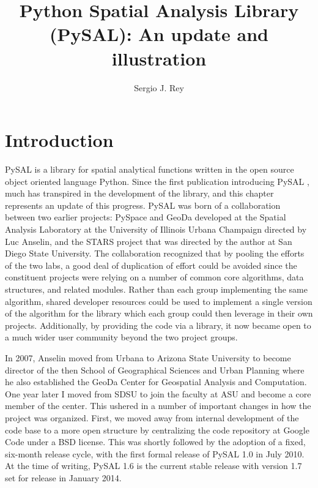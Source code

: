 \documentclass[11pt, titlepage]{amsart}
\author{Sergio J. Rey}
\title[PySAL]{Python Spatial Analysis Library (PySAL): An update and
illustration}
\date{}
\begin{document}
\maketitle


\section{Introduction}
PySAL is a library for spatial analytical functions written in the open
source object oriented language Python.
Since the first publication introducing PySAL \citep{Rey:2007ox},
much has transpired in the development of the library, and this chapter
represents an update of this progress. PySAL was born of a
collaboration between two earlier projects: PySpace and GeoDa developed
at the Spatial Analysis Laboratory at the University of Illinois Urbana
Champaign directed by Luc Anselin, and the STARS project that was
directed by the author at San Diego State University. The collaboration
recognized that by pooling the efforts of the two
labs, a good deal of duplication of effort could be avoided since the
constituent projects were relying on a number of common core algorithms,
data structures, and related modules.  Rather than each group
implementing the same algorithm, shared developer resources could be
used to implement a single version of the algorithm for the library
which each group could then leverage in their own projects.
Additionally, by providing the code via a library, it now became open to
a much wider user community beyond the two project groups.

In 2007, Anselin moved from Urbana to Arizona State University to become
director of the then School of Geographical Sciences and Urban Planning
where he also established the GeoDa Center for Geospatial Analysis and
Computation. One year later I moved from SDSU to join the faculty at ASU
and become a core member of the center. This ushered in a number of
important changes in how the project was organized. First, we moved away
from internal development of the code base to a more open structure by
centralizing the code repository at Google Code under a BSD license.
This was shortly followed by the adoption of a fixed, six-month release
cycle, with the first formal release of PySAL 1.0 in July 2010. At the
time of writing, PySAL 1.6 is the current stable release with version
1.7 set for release in January 2014.
\end{document}
